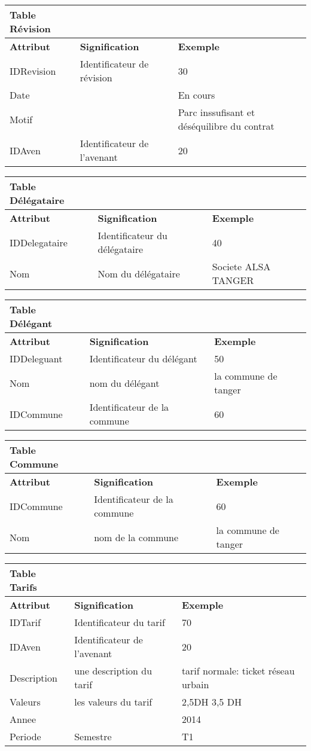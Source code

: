 \documentclass[
]{article}
\begin{document}
\begin{enumerate}
\begin{itemize}
    \begin{longtable}[]{@{}lll@{}}
    \toprule
    Table Révision & &\tabularnewline
    \midrule
    \endhead
    \textbf{Attribut} & \textbf{Signification} &
    \textbf{Exemple}\tabularnewline
    IDRevision & Identificateur de révision & 30\tabularnewline
    Date & & En cours\tabularnewline
    Motif & & Parc inssufisant et déséquilibre du contrat\tabularnewline
    IDAven & Identificateur de l'avenant & 20\tabularnewline
    \bottomrule
    \end{longtable}

    \begin{longtable}[]{@{}lll@{}}
    \toprule
    Table Délégataire & &\tabularnewline
    \midrule
    \endhead
    \textbf{Attribut} & \textbf{Signification} &
    \textbf{Exemple}\tabularnewline
    IDDelegataire & Identificateur du délégataire & 40\tabularnewline
    Nom & Nom du délégataire & Societe ALSA TANGER\tabularnewline
    \bottomrule
    \end{longtable}

    \begin{longtable}[]{@{}lll@{}}
    \toprule
    Table Délégant & &\tabularnewline
    \midrule
    \endhead
    \textbf{Attribut} & \textbf{Signification} &
    \textbf{Exemple}\tabularnewline
    IDDeleguant & Identificateur du délégant & 50\tabularnewline
    Nom & nom du délégant & la commune de tanger\tabularnewline
    IDCommune & Identificateur de la commune & 60\tabularnewline
    \bottomrule
    \end{longtable}

    \begin{longtable}[]{@{}lll@{}}
    \toprule
    Table Commune & &\tabularnewline
    \midrule
    \endhead
    \textbf{Attribut} & \textbf{Signification} &
    \textbf{Exemple}\tabularnewline
    IDCommune & Identificateur de la commune & 60\tabularnewline
    Nom & nom de la commune & la commune de tanger\tabularnewline
    \bottomrule
    \end{longtable}

    \begin{longtable}[]{@{}lll@{}}
    \toprule
    Table Tarifs & &\tabularnewline
    \midrule
    \endhead
    \textbf{Attribut} & \textbf{Signification} &
    \textbf{Exemple}\tabularnewline
    IDTarif & Identificateur du tarif & 70\tabularnewline
    IDAven & Identificateur de l'avenant & 20\tabularnewline
    Description & une description du tarif & tarif normale: ticket
    réseau urbain\tabularnewline
    Valeurs & les valeurs du tarif & 2,5DH 3,5 DH\tabularnewline
    Annee & & 2014\tabularnewline
    Periode & Semestre & T1\tabularnewline
    \bottomrule
    \end{longtable}


\end{itemize}
\end{enumerate}
\end{document}
